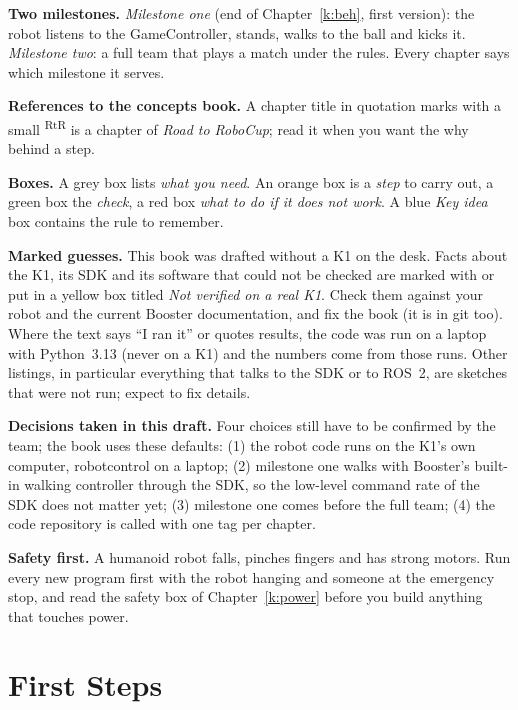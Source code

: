 \documentclass[11pt,a4paper,twoside]{book}
\begin{document}
\textbf{Two milestones.} \emph{Milestone one} (end of Chapter~\ref{k:beh}, first version): the robot listens to the GameController, stands, walks to the ball and kicks it. \emph{Milestone two}: a full team that plays a match under the rules. Every chapter says which milestone it serves.

\textbf{References to the concepts book.} A chapter title in quotation marks with a small \textsuperscript{\textcolor{cupnavy}{\sffamily\scriptsize RtR}} is a chapter of \emph{Road to RoboCup}; read it when you want the why behind a step.

\textbf{Boxes.} A grey box lists \emph{what you need}. An orange box is a \emph{step} to carry out, a green box the \emph{check}, a red box \emph{what to do if it does not work}. A blue \emph{Key idea} box contains the rule to remember.

\textbf{Marked guesses.} This book was drafted without a K1 on the desk. Facts about the K1, its SDK and its software that could not be checked are marked with \guess{} or put in a yellow box titled \emph{Not verified on a real K1}. Check them against your robot and the current Booster documentation, and fix the book (it is in git too). Where the text says ``I ran it'' or quotes results, the code was run on a laptop with Python~3.13 (never on a K1) and the numbers come from those runs. Other listings, in particular everything that talks to the SDK or to ROS~2, are sketches that were not run; expect to fix details.

\textbf{Decisions taken in this draft.} Four choices still have to be confirmed by the team; the book uses these defaults: (1) the robot code runs on the K1's own computer, robotcontrol on a laptop; (2) milestone one walks with Booster's built-in walking controller through the SDK, so the low-level command rate of the SDK does not matter yet; (3) milestone one comes before the full team; (4) the code repository is called \coderepo{} with one tag per chapter.

\textbf{Safety first.} A humanoid robot falls, pinches fingers and has strong motors. Run every new program first with the robot hanging and someone at the emergency stop, and read the safety box of Chapter~\ref{k:power} before you build anything that touches power.

\mainmatter

\part{First Steps}\label{kpart:first}
\end{document}
